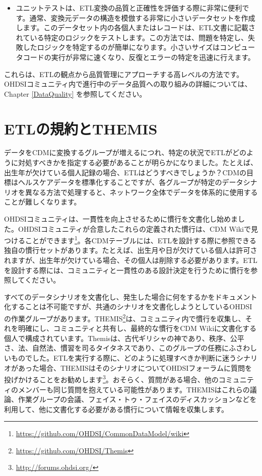\documentclass[
  11pt]{book}
\providecommand{\tightlist}{%
  \setlength{\itemsep}{0pt}\setlength{\parskip}{0pt}}
\theoremstyle{definition}
\theoremstyle{definition}
\theoremstyle{definition}
\theoremstyle{definition}
\theoremstyle{remark}
\begin{document}
\begin{itemize}
  \begin{itemize}
  \tightlist
  \item
    ユニットテストは、ETL変換の品質と正確性を評価する際に非常に便利です。通常、変換元データの構造を模倣する非常に小さいデータセットを作成します。このデータセット内の各個人またはレコードは、ETL文書に記載されている特定のロジックをテストします。この方法では、問題を特定し、失敗したロジックを特定するのが簡単になります。小さいサイズはコンピュータコードの実行が非常に速くなり、反復とエラーの特定を迅速に行えます。
  \end{itemize}
\end{itemize}

これらは、ETLの観点から品質管理にアプローチする高レベルの方法です。OHDSIコミュニティ内で進行中のデータ品質への取り組みの詳細については、Chapter \ref{DataQuality} を参照してください。

\section{ETLの規約とTHEMIS}\label{etlux306eux898fux7d04ux3068themis}

データをCDMに変換するグループが増えるにつれ、特定の状況でETLがどのように対処すべきかを指定する必要があることが明らかになりました。たとえば、出生年が欠けている個人記録の場合、ETLはどうすべきでしょうか？CDMの目標はヘルスケアデータを標準化することですが、各グループが特定のデータシナリオを異なる方法で処理すると、ネットワーク全体でデータを体系的に使用することが難しくなります。

OHDSIコミュニティは、一貫性を向上させるために慣行を文書化し始めました。OHDSIコミュニティが合意したこれらの定義された慣行は、CDM Wikiで見つけることができます\footnote{\url{https://github.com/OHDSI/CommonDataModel/wiki}}。各CDMテーブルには、ETLを設計する際に参照できる独自の慣行セットがあります。たとえば、出生月や日が欠けている個人は許可されますが、出生年が欠けている場合、その個人は削除する必要があります。ETLを設計する際には、コミュニティと一貫性のある設計決定を行うために慣行を参照してください。

すべてのデータシナリオを文書化し、発生した場合に何をするかをドキュメント化することは不可能ですが、共通のシナリオを文書化しようとしているOHDSIの作業グループがあります。THEMIS\footnote{\url{https://github.com/OHDSI/Themis}}は、コミュニティ内で慣行を収集し、それを明確にし、コミュニティと共有し、最終的な慣行をCDM Wikiに文書化する個人で構成されています。Themisは、古代ギリシャの神であり、秩序、公平さ、法、自然法、慣習を司るタイタネスであり、このグループの任務にふさわしいものでした。ETLを実行する際に、どのように処理すべきか判断に迷うシナリオがあった場合、THEMISはそのシナリオについてOHDSIフォーラムに質問を投げかけることをお勧めします\footnote{\url{http://forums.ohdsi.org/}}。おそらく、質問がある場合、他のコミュニティのメンバーも同じ質問を抱えている可能性があります。THEMISはこれらの議論、作業グループの会議、フェイス・トゥ・フェイスのディスカッションなどを利用して、他に文書化する必要がある慣行について情報を収集します。
\end{document}

